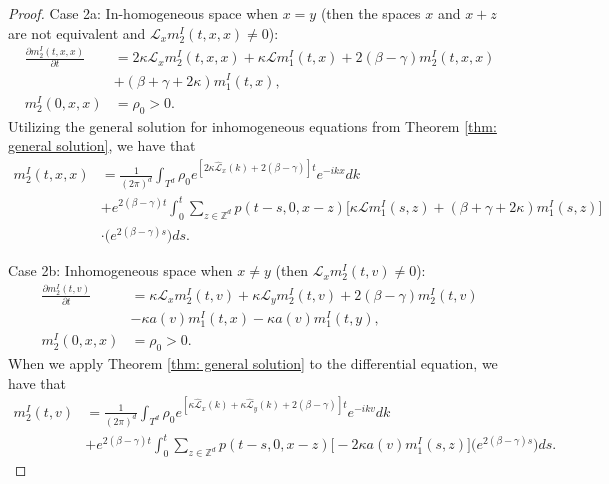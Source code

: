 \documentclass[sn-basic]{sn-jnl}%
\theoremstyle{thmstyleone}%
\theoremstyle{thmstyletwo}%
\theoremstyle{thmstylethree}%
\numberwithin{equation}{theorem}
\begin{document}
\begin{proof}
Case 2a: In-homogeneous space when $x=y$ (then the spaces $x$ and $x+z$ are not equivalent and $\mathcal{L}_{x} m_{2}^{I}(t,x,x) \neq 0$):
\begin{align*}
\displaystyle \frac{\partial m_{2}^{I}(t,x,x)}{\partial t} &=  2 \kappa \mathcal{L}_{x} m_{2}^{I}(t,x,x) + \kappa \mathcal{L} m_{1}^{I}(t,x) + 2(\beta - \gamma) m_{2}^{I}(t,x,x)\\
& + (\beta + \gamma +2\kappa) m_{1}^{I}(t,x),\\ 
m_{2}^{I}(0,x,x) &= \rho_{0}>0.
\end{align*}
Utilizing the general solution for inhomogeneous equations from Theorem \ref{thm: general solution}, we have that
\begin{align*}
m_{2}^{I}(t,x,x) &= \displaystyle \frac{1}{(2 \pi)^d} \int_{T^d} \rho_{0} e^{\displaystyle [2\kappa \hat{\mathcal{L}}_{x}(k) + 2(\beta-\gamma)]t} e^{\displaystyle -ikx}dk\\
&+ e^{\displaystyle 2(\beta-\gamma)t} \displaystyle\int_{0}^{t} \sum\limits_{z \in \mathbb{Z}^d} p(t-s,0,x-z)\Big[\kappa \mathcal{L}m_{1}^{I}(s,z)+(\beta+\gamma+2\kappa)m_{1}^{I}(s,z)\Big]\\\
&\cdot \Big(e^{\displaystyle 2(\beta-\gamma)s}\Big)ds.
\end{align*}

Case 2b: Inhomogeneous space when $x \neq y$ (then $\mathcal{L}_{x}m_{2}^{I}(t,v) \neq 0$):
\begin{align*}
\displaystyle \frac{\partial m_{2}^{I}(t,v)}{\partial t} &= \kappa \mathcal{L}_{x} m_{2}^{I}(t,v) + \kappa \mathcal{L}_{y} m_{2}^{I}(t,v) + 2(\beta- \gamma) m_{2}^{I}(t,v)\\
&- \kappa a(v) m_{1}^{I}(t,x) - \kappa a(v) m_{1}^{I}(t,y),\\
m_{2}^{I}(0,x,x) &= \rho_{0}>0.
\end{align*}
When we apply Theorem \ref{thm: general solution} to the differential equation, we have that
\begin{align*}
m_{2}^{I}(t,v) &= \displaystyle \frac{1}{(2\pi)^d} \int_{T^d} \rho_{0} e^{\displaystyle [\kappa \hat{\mathcal{L}}_{x}(k) + \kappa \hat{\mathcal{L}}_{y}(k) + 2 (\beta- \gamma)]t} e^{\displaystyle -ikv}dk\\
&+ e^{\displaystyle 2(\beta- \gamma) t} \displaystyle \int_{0}^{t} \sum\limits_{z \in \mathbb{Z}^d} p(t-s,0,x-z) \Big[-2 \kappa a(v)m_{1}^{I}(s,z)\Big]\Big(e^{\displaystyle 2(\beta-\gamma)s}\Big)ds.
\end{align*}
\end{proof}
\end{document}

